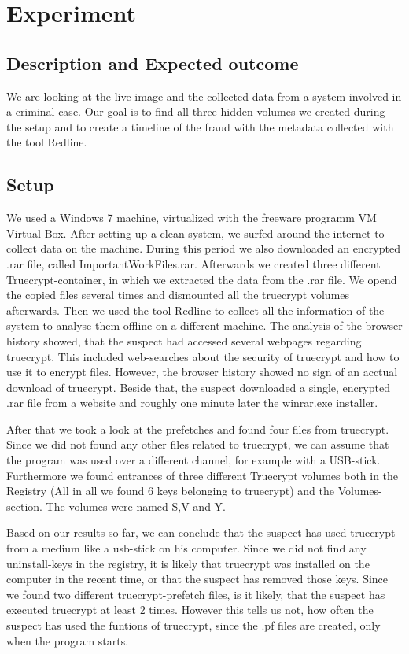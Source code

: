 \section{Experiment}
\subsection{Description and Expected outcome}
We are looking at the live image and the collected data from a system involved in a criminal case. Our goal is to find
all three hidden volumes we created during the setup and to create a timeline of the fraud with the metadata collected with
the tool Redline.

\subsection{Setup}
We used a Windows 7 machine, virtualized with the freeware programm VM Virtual Box. After setting up a clean system, we 
surfed around the internet to collect data on the machine. During this period we also downloaded an encrypted
.rar file, called ImportantWorkFiles.rar. Afterwards we created three different Truecrypt-container, in which we extracted
the data from the .rar file. We opend the copied files several times and dismounted all the truecrypt volumes afterwards.
Then we used the tool Redline to collect all the information of the system to analyse them offline on a different
machine.
The analysis of the browser history showed, that the suspect had accessed several webpages regarding truecrypt. This included web-searches about the security of truecrypt and how to use it to encrypt files. However, the browser history showed no sign of an acctual download of truecrypt. Beside that, the suspect downloaded a single, encrypted .rar file from a website and roughly one minute later the winrar.exe installer.

After that we took a look at the prefetches and found four files from truecrypt. Since we did not found any other files related to truecrypt, we can assume that the program was used over a different channel, for example with a USB-stick. Furthermore we found entrances of three different Truecrypt volumes both in the Registry (All in all we found 6 keys belonging to truecrypt) and the Volumes-section. The volumes were named S,V and Y.

Based on our results so far, we can conclude that the suspect has used truecrypt from a medium like a usb-stick on his computer. Since we did not find any uninstall-keys in the registry, it is likely that truecrypt was installed on the computer in the recent time, or that the suspect has removed those keys. Since we found two different truecrypt-prefetch files, is it likely, that the suspect has executed truecrypt at least 2 times. However this tells us not, how often the suspect has used the funtions of truecrypt, since the .pf files are created, only when the program starts.

